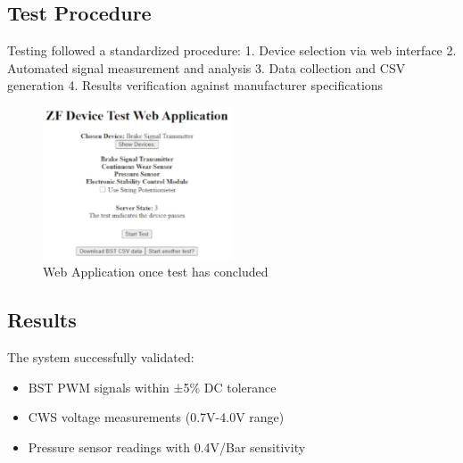 \documentclass[12pt]{article}
\begin{document}
\subsection{Test Procedure}

Testing followed a standardized procedure: 1. Device selection via web
interface 2. Automated signal measurement and analysis 3. Data collection
and CSV generation 4. Results verification against manufacturer
specifications

\begin{figure}[H]
  \centering
  \includegraphics[width=0.5\textwidth]{../assets/webapp-testing.png}
  \caption{Web Application once test has concluded}
\end{figure}

\subsection{Results}

The system successfully validated: 
\begin{itemize} 
  \item BST PWM signals within ±5\% DC tolerance 
  \item CWS voltage measurements (0.7V-4.0V range) 
  \item Pressure sensor readings with 0.4V/Bar sensitivity
\end{itemize}
\end{document}
